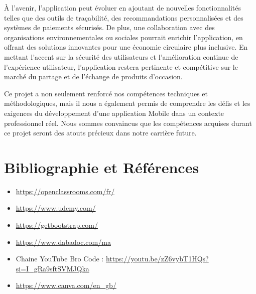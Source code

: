 \documentclass[12pt,a4paper]{report}
\begin{document}
	À l'avenir, l'application peut évoluer en ajoutant de nouvelles fonctionnalités telles que des outils de traçabilité, des recommandations personnalisées et des systèmes de paiements sécurisés. De plus, une collaboration avec des organisations environnementales ou sociales pourrait enrichir l'application, en offrant des solutions innovantes pour une économie circulaire plus inclusive. En mettant l'accent sur la sécurité des utilisateurs et l'amélioration continue de l'expérience utilisateur, l'application restera pertinente et compétitive sur le marché du partage et de l'échange de produits d'occasion.
	
	Ce projet a non seulement renforcé nos compétences techniques et méthodologiques, mais il nous a également permis de comprendre les défis et les exigences du développement d'une application Mobile dans un contexte professionnel réel. Nous sommes convaincus que les compétences acquises durant ce projet seront des atouts précieux dans notre carrière future.
	
	\chapter*{Bibliographie et Références}
	\begin{itemize}
		\item \url{https://openclassrooms.com/fr/}
		\item \url{https://www.udemy.com/}
		\item \url{https://getbootstrap.com/}
		\item \url{https://www.dabadoc.com/ma}
		\item Chaine YouTube Bro Code : \url{https://youtu.be/zZ6vybT1HQs?si=I_gRa9sftSVMJQka}
		\item \url{https://www.canva.com/en_gb/}
	\end{itemize}
\end{document}
